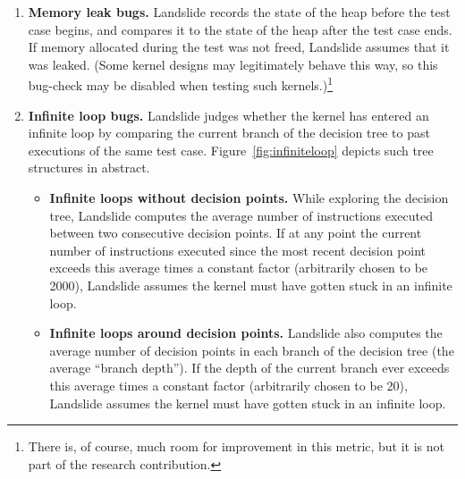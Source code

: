 \begin{enumerate}
	\item {\bf Memory leak bugs.} Landslide records the state of the heap before the test case begins, and compares it to the state of the heap after the test case ends. If memory allocated during the test was not freed, Landslide assumes that it was leaked.
		(Some kernel designs may legitimately behave this way, so this bug-check may be disabled when testing such kernels.)\footnote{There is, of course, much room for improvement in this metric, but it is not part of the research contribution.}
	\item {\bf Infinite loop bugs.} Landslide judges whether the kernel has entered an infinite loop by comparing the current branch of the decision tree to past executions of the same test case.
	Figure~\ref{fig:infiniteloop} depicts such tree structures in abstract.
	\begin{itemize}
		\item {\bf Infinite loops without decision points.} While exploring the decision tree, Landslide computes the average number of instructions executed between two consecutive decision points. If at any point the current number of instructions executed since the most recent decision point exceeds this average times a constant factor (arbitrarily chosen to be 2000), Landslide assumes the kernel must have gotten stuck in an infinite loop.
		\item {\bf Infinite loops around decision points.} Landslide also computes the average number of decision points in each branch of the decision tree (the average ``branch depth''). If the depth of the current branch ever exceeds this average times a constant factor (arbitrarily chosen to be 20), Landslide assumes the kernel must have gotten stuck in an infinite loop.
	\end{itemize}
\end{enumerate}

